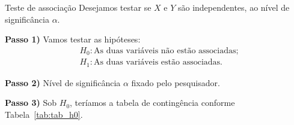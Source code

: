 \documentclass[9pt]{beamer}
\begin{document}
\begin{frame}{Teste de associação}
Desejamos testar se $X$ e $Y$ são independentes, ao nível de significância $\alpha$.

\textbf{Passo 1)}  Vamos testar as hipóteses:
\begin{align*}
&H_0: \mbox{As duas variáveis não estão associadas};\\
&H_1: \mbox{As duas variáveis estão associadas}.
\end{align*}
\vfill

{\bf Passo 2)} Nível de significância $\alpha$ fixado pelo pesquisador.
\vfill

{\bf Passo 3)} Sob $H_0$, teríamos a tabela de contingência conforme Tabela~\ref{tab:tab_h0}.


\begin{table}[htbp]
	\centering
	\caption{Tabela de contingência sob $H_0$.}
	\label{tab:tab_h0}
\end{table}

\end{frame}
\end{document}
